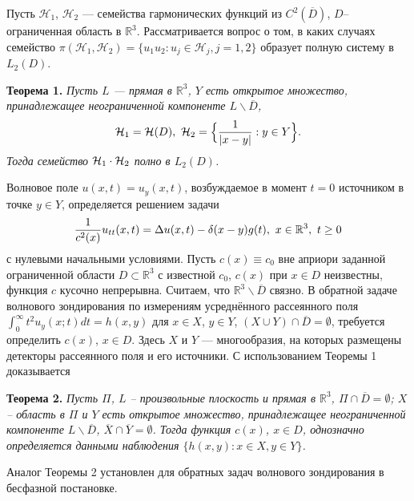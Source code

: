
\vzmscaption
Пусть ${\mathcal H}_1$, ${\mathcal H}_2$ --- семейства гармонических функций из $C^2({\overline D})$, $D$--ограниченная область в $\mathbb{R}^3$.
Рассматривается вопрос о том, в каких случаях семейство $\pi({\mathcal H}_1,{\mathcal H}_2)=\{ u_1 u_2: u_j \in {\mathcal H}_j, j=1,2 \}$
образует полную систему в $L_2(D)$.

{\bf Теорема 1.} {\it Пусть $L$ --- прямая в $\mathbb{R}^3$, $Y$ есть открытое множество, принадлежащее неограниченной компоненте $L\backslash {\overline D}$,
$$
{\cal H}_1={\cal H}(D), \,\, {\cal H}_2=\Bigl\{ {{1}\over{\vert x-y\vert}}: y\in Y \Bigr\}.
$$
Тогда семейство ${\cal H}_1 \cdot {\cal H}_2$ полно в $L_{2}(D)$.
}


Волновое поле $u(x,t)=u_y(x,t)$, возбуждаемое в момент $t=0$ источником в точке $y\in Y$, определяется решением задачи
$$
{{1}\over{c^2(x)}} u_{tt}(x,t)=\Delta
u(x,t)-\delta(x-y) g(t), \,\, x\in \mathbb{R}^3, \,\, t\geq 0
$$
с нулевыми начальными условиями. Пусть $c(x)\equiv c_0$ вне априори заданной ограниченной области $D \subset \mathbb{R}^3$ с известной $c_0$, $c(x)$ при $x\in D$ неизвестны, функция $c$ кусочно непрерывна. Считаем, что ${\mathbb R}^3 \backslash {\overline D}$ связно.
В обратной задаче волнового зондирования по измерениям усреднённого рассеянного поля $\int_0^{\infty} t^2 u_y(x;t)dt=h(x,y)$ для $x\in X$, $y\in Y$, $(X\cup Y)\cap {\overline D}=\emptyset$, требуется определить $c(x)$, $x\in D$. Здесь $X$ и $Y$ --- многообразия, на которых размещены детекторы рассеянного поля и его источники. С использованием Теоремы 1 доказывается

{\bf Теорема 2.} {\it Пусть $\Pi$, ${L}$ -- произвольные плоскость и прямая в $\mathbb{R}^3$, $\Pi\cap {\overline D}=\emptyset$; $X$ -- область в $\Pi$ и $Y$ есть открытое множество, принадлежащее неограниченной компоненте $L\backslash {\overline D}$, ${\overline X} \cap {\overline Y}=\emptyset$. Тогда функция $c(x)$, $x\in D$, однозначно определяется данными наблюдения $\{ h(x,y): x\in X, y\in Y \}$.
}

Аналог Теоремы 2 установлен для обратных задач волнового зондирования в бесфазной постановке.
